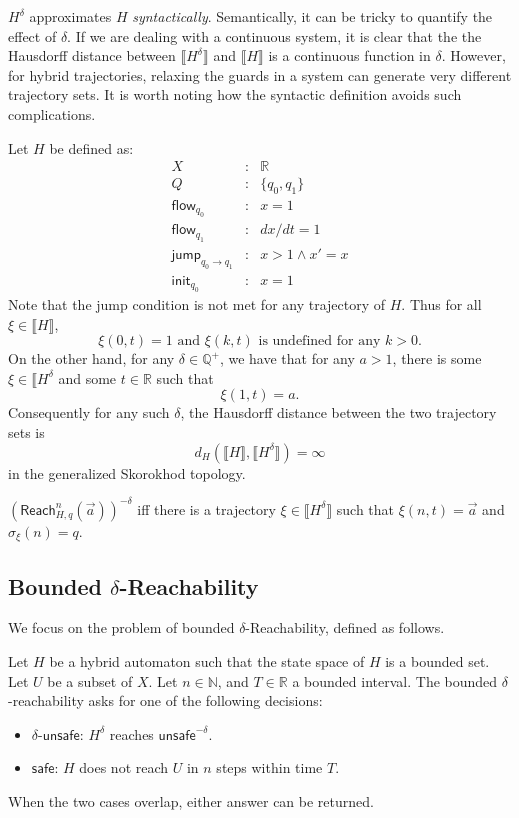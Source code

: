 \documentclass[envcountsect]{llncs}
\newcommand{\flow}{\mathsf{flow}}
\newcommand{\jump}{\mathsf{jump}}
\newcommand{\init}{\mathsf{init}}
\newcommand{\reach}{\mathsf{Reach}}
\newcommand{\unsafe}{\mathsf{unsafe}}
\newcommand{\safe}{\mathsf{safe}}
\begin{document}
\begin{remark}
$H^{\delta}$ approximates $H$ {\em syntactically}. Semantically, it can be tricky to quantify the effect of $\delta$. If we are dealing with a continuous system, it is clear that the the Hausdorff distance between $\llbracket H^{\delta}\rrbracket$ and $\llbracket H\rrbracket$ is a continuous function in $\delta$. However, for hybrid trajectories, relaxing the guards in a system can generate very different trajectory sets. It is worth noting how the syntactic definition avoids such complications. 
\end{remark}
\begin{example}
Let $H$ be defined as:
\begin{eqnarray*} 
X &:& \mathbb{R}\\
Q &:& \{q_0, q_1\}\\
\flow_{q_0} &:& x = 1\\
\flow_{q_1} &:& dx/dt = 1\\
\jump_{q_0\rightarrow q_1} &:& x >1 \wedge x' = x\\
\init_{q_0} &:& x=1
\end{eqnarray*}
Note that the jump condition is not met for any trajectory of $H$. Thus for all $\xi\in \llbracket H\rrbracket$, 
$$\xi(0, t) = 1\mbox{ and }\xi(k,t)\mbox{ is undefined for any $k>0$.}$$
On the other hand, for any $\delta\in \mathbb{Q}^+$, we have that for any $a > 1$, there is some $\xi\in \llbracket H^{\delta}$ and some $t\in \mathbb{R}$ such that
$$\xi(1, t) = a.$$
Consequently for any such $\delta$, the Hausdorff distance between the two trajectory sets is
$$d_{H}(\llbracket H\rrbracket, \llbracket H^{\delta}\rrbracket) = \infty$$
in the generalized Skorokhod topology. 
\end{example}

\begin{proposition}\label{equiv-delta}
$(\reach_{H,q}^n(\vec a))^{-\delta}$ iff there is a trajectory $\xi\in \llbracket H^{\delta}\rrbracket$ such that $\xi(n, t) = \vec a$ and $\sigma_{\xi}(n) = q$.  
\end{proposition}

\subsection{Bounded $\delta$-Reachability}

We focus on the problem of bounded $\delta$-Reachability, defined as follows. 

\begin{definition}
Let $H$ be a hybrid automaton such that the state space of $H$ is a bounded set. Let $U$ be a subset of $X$. Let $n\in \mathbb{N}$, and $T\in \mathbb{R}$ a bounded interval. The bounded $\delta$-reachability asks for one of the following decisions:
\begin{itemize}
\item $\delta$-$\unsafe$: $H^{\delta}$ reaches $\unsafe^{-\delta}$.  
\item $\safe$: $H$ does not reach $U$ in $n$ steps within time $T$. 
\end{itemize} 
When the two cases overlap, either answer can be returned. 
\end{definition}
\end{document}

